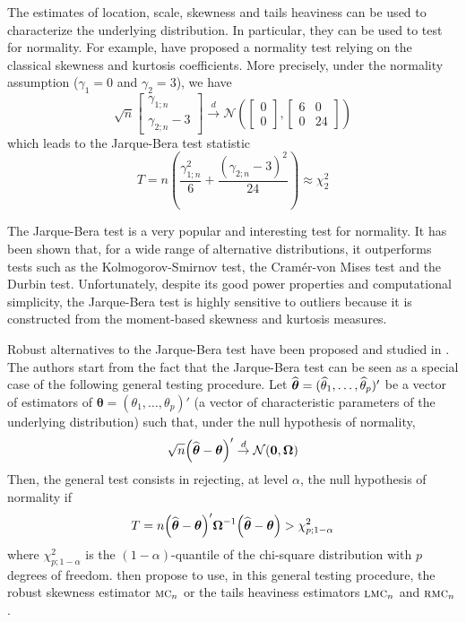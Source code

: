 The estimates of location, scale, skewness and tails heaviness can be used to
characterize the underlying distribution. In particular, they can be used to
test for normality. For example, \citet{Jarque:Bera:1980} have proposed a
normality test relying on the classical skewness and kurtosis coefficients.
More precisely, under the normality assumption ($\gamma_1=0$ and $\gamma_2=3$),
we have
\[ 
    \sqrt{n}
    \begin{bmatrix}
        \gamma_{1;n} \\
        \gamma_{2;n} - 3
    \end{bmatrix}
    \stackrel{d}{\rightarrow}
    \mathcal{N}\left(
    \begin{bmatrix}
        0 \\
        0
    \end{bmatrix},
    \begin{bmatrix}
        6 & 0\\
        0 & 24
    \end{bmatrix}
    \right)
\]
which leads to the Jarque-Bera test statistic
\[
    T = n \left(\frac{\gamma_{1;n}^2}{6} + 
          \frac{\left(\gamma_{2;n} - 3\right)^2}{24}\right)
    \approx \chi_2^2
\]

The Jarque-Bera test is a very popular and interesting test for normality. It
has been shown that, for a wide range of alternative distributions, it
outperforms tests such as the Kolmogorov-Smirnov test, the Cramér-von Mises
test and the Durbin test. Unfortunately, despite its good power properties and
computational simplicity, the Jarque-Bera test is highly sensitive to outliers
because it is constructed from the moment-based skewness and kurtosis measures.

Robust alternatives to the Jarque-Bera test have been proposed and studied in
\citet{brys:etal:2008}. The authors start from the fact that the Jarque-Bera
test can be seen as a special case of the following general testing procedure.
Let $\widehat{\boldsymbol\theta} = (\widehat{\theta}_1, \dots, \widehat{\theta}_p)'$
be a vector of estimators of $\boldsymbol\theta = (\theta_1, \dots, \theta_p)'$
(a vector of characteristic parameters of the underlying distribution) such
that, under the null hypothesis of normality,
\[
    \sqrt{n} \left(\sthat{\boldsymbol\theta} - \boldsymbol{\theta}\right)'
    \stackrel{d}{\rightarrow}
    \mathcal{N}(\stvec{0},\boldsymbol\Omega)
\]
Then, the general test consists in rejecting, at level $\alpha$, the null
hypothesis of normality if
\[
    T = n\left(\sthat{\boldsymbol\theta} - \boldsymbol\theta\right)'
    \boldsymbol\Omega^{-1}
    \left(\sthat{\boldsymbol\theta} - \boldsymbol\theta\right)
    > \chi_{p;1-\alpha}^2
\]
where $\chi_{p;1-\alpha}^2$ is the $(1-\alpha)$-quantile of the chi-square
distribution with $p$ degrees of freedom. \citet{brys:etal:2008} then propose
to use, in this general testing procedure, the robust skewness estimator
$\stsc{MC}_n$ or the tails heaviness estimators $\stsc{LMC}_n$ and
$\stsc{RMC}_n$.

